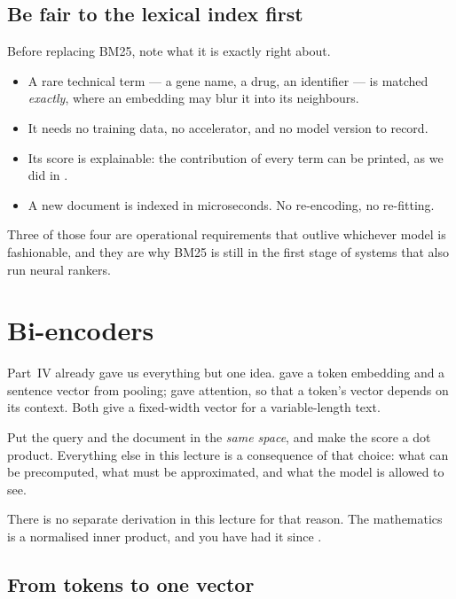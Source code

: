 \documentclass[11pt,a4paper]{article}
\begin{document}
\subsection{Be fair to the lexical index first}

Before replacing BM25, note what it is exactly right about.

\begin{itemize}[leftmargin=*,nosep]
  \item A rare technical term --- a gene name, a drug, an identifier --- is
        matched \emph{exactly}, where an embedding may blur it into its
        neighbours.
  \item It needs no training data, no accelerator, and no model version to
        record.
  \item Its score is explainable: the contribution of every term can be
        printed, as we did in .
  \item A new document is indexed in microseconds. No re-encoding, no
        re-fitting.
\end{itemize}

Three of those four are operational requirements that outlive whichever model
is fashionable, and they are why BM25 is still in the first stage of systems
that also run neural rankers.

\section{Bi-encoders}

Part~IV already gave us everything but one idea.  gave a token
embedding and a sentence vector from pooling;  gave attention, so
that a token's vector depends on its context. Both give a fixed-width vector
for a variable-length text.

\begin{keybox}[title={The one new idea}]
Put the query and the document in the \emph{same space}, and make the score a
dot product. Everything else in this lecture is a consequence of that choice:
what can be precomputed, what must be approximated, and what the model is
allowed to see.
\end{keybox}

There is no separate derivation in this lecture for that reason. The
mathematics is a normalised inner product, and you have had it since
.

\subsection{From tokens to one vector}
\end{document}
